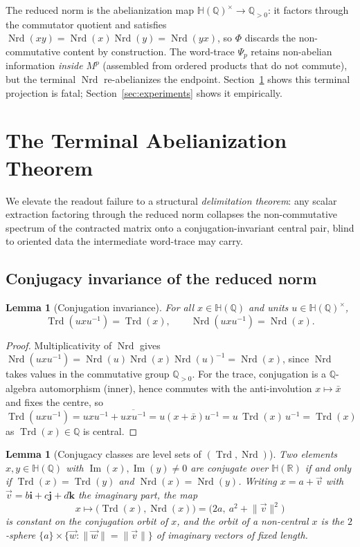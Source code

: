 \documentclass[pdflatex,sn-mathphys-num]{sn-jnl}
\theoremstyle{thmstyleone}%
\newtheorem{lemma}[theorem]{Lemma}%
\theoremstyle{thmstyletwo}%
\theoremstyle{thmstylethree}%
\newcommand{\HH}{\mathbb{H}}
\newcommand{\QQ}{\mathbb{Q}}
\newcommand{\RR}{\mathbb{R}}
\newcommand{\Nrd}{\operatorname{Nrd}}
\newcommand{\Trd}{\operatorname{Trd}}
\newcommand{\bi}{\mathbf{i}}
\newcommand{\bj}{\mathbf{j}}
\newcommand{\bk}{\mathbf{k}}
\DeclareMathOperator{\im}{Im}
\begin{document}
The reduced norm is the abelianization map
$\HH(\QQ)^{\times}\to\QQ_{>0}$: it factors through the commutator quotient
and satisfies $\Nrd(xy)=\Nrd(x)\Nrd(y)=\Nrd(yx)$, so $\Phi$ discards the
non-commutative content by construction. The word-trace $\Psi_p$ retains
non-abelian information \emph{inside} $M^p$ (assembled from ordered products
that do not commute), but the terminal $\Nrd$ re-abelianizes the endpoint.
Section~\ref{sec:terminal} shows this terminal projection is fatal;
Section~\ref{sec:experiments} shows it empirically.

\newpage

\section{The Terminal Abelianization Theorem}\label{sec:terminal}

We elevate the readout failure to a structural \emph{delimitation theorem}:
any scalar extraction factoring through the reduced norm collapses the
non-commutative spectrum of the contracted matrix onto a conjugation-invariant
central pair, blind to oriented data the intermediate word-trace may carry.

\subsection{Conjugacy invariance of the reduced norm}

\begin{lemma}[Conjugation invariance]\label{lem:conjinv}
For all $x\in\HH(\QQ)$ and units $u\in\HH(\QQ)^{\times}$,
\[
  \Trd(uxu^{-1})=\Trd(x),\qquad \Nrd(uxu^{-1})=\Nrd(x).
\]
\end{lemma}

\begin{proof}
Multiplicativity of $\Nrd$ gives
$\Nrd(uxu^{-1})=\Nrd(u)\Nrd(x)\Nrd(u)^{-1}=\Nrd(x)$, since $\Nrd$ takes
values in the commutative group $\QQ_{>0}$. For the trace, conjugation is a
$\QQ$-algebra automorphism (inner), hence commutes with the anti-involution
$x\mapsto\bar x$ and fixes the centre, so
$\Trd(uxu^{-1})=uxu^{-1}+\overline{uxu^{-1}}
=u(x+\bar x)u^{-1}=u\,\Trd(x)\,u^{-1}=\Trd(x)$ as $\Trd(x)\in\QQ$ is
central.
\end{proof}

\begin{lemma}[Conjugacy classes are level sets of $(\Trd,\Nrd)$]
\label{lem:levelsets}
Two elements $x,y\in\HH(\QQ)$ with $\im(x),\im(y)\neq0$ are conjugate over
$\HH(\RR)$ if and only if $\Trd(x)=\Trd(y)$ and $\Nrd(x)=\Nrd(y)$. Writing
$x=a+\vec v$ with $\vec v=b\bi+c\bj+d\bk$ the imaginary part, the map
\[
  x\longmapsto\big(\Trd(x),\Nrd(x)\big)=\big(2a,\ a^2+\lVert\vec v\rVert^2\big)
\]
is constant on the conjugation orbit of $x$, and the orbit of a
non-central $x$ is the $2$-sphere $\{a\}\times\{\vec w:\lVert\vec
w\rVert=\lVert\vec v\rVert\}$ of imaginary vectors of fixed length.
\end{lemma}
\end{document}
